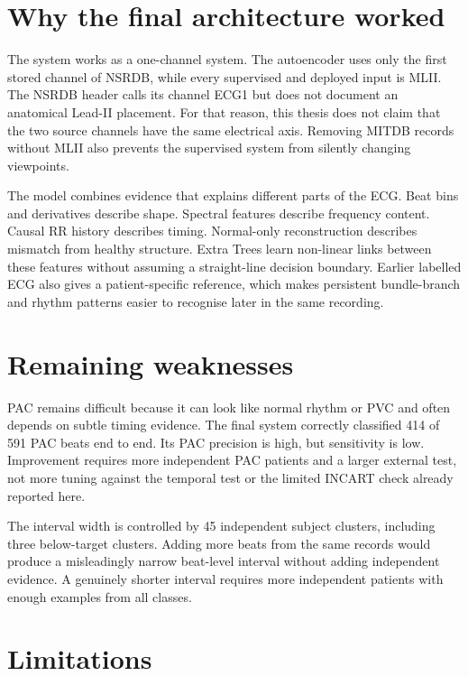 \section{Why the final architecture worked}

The system works as a one-channel system. The autoencoder uses only the first
stored channel of NSRDB, while every supervised and deployed input is MLII. The
NSRDB header calls its channel ECG1 but does not document an anatomical Lead-II
placement. For that reason, this thesis does not claim that the two source
channels have the same electrical axis. Removing MITDB records without MLII
also prevents the supervised system from silently changing viewpoints.

The model combines evidence that explains different parts of the ECG. Beat bins
and derivatives describe shape. Spectral features describe frequency content.
Causal RR history describes timing. Normal-only reconstruction describes
mismatch from healthy structure. Extra Trees learn non-linear links between
these features without assuming a straight-line decision boundary. Earlier
labelled ECG also gives a patient-specific reference, which makes persistent
bundle-branch and rhythm patterns easier to recognise later in the same
recording.

\section{Remaining weaknesses}

PAC remains difficult because it can look like normal rhythm or PVC and often
depends on subtle timing evidence. The final system correctly classified 414
of 591 PAC beats end to end. Its PAC precision is high, but sensitivity is low.
Improvement requires more independent PAC patients and a larger external test,
not more tuning against the temporal test or the limited INCART check already
reported here.

The interval width is controlled by 45 independent subject clusters, including
three below-target clusters. Adding more beats from the same records would
produce a misleadingly narrow beat-level interval without adding independent
evidence. A genuinely shorter interval requires more independent patients with
enough examples from all classes.

\section{Limitations}

